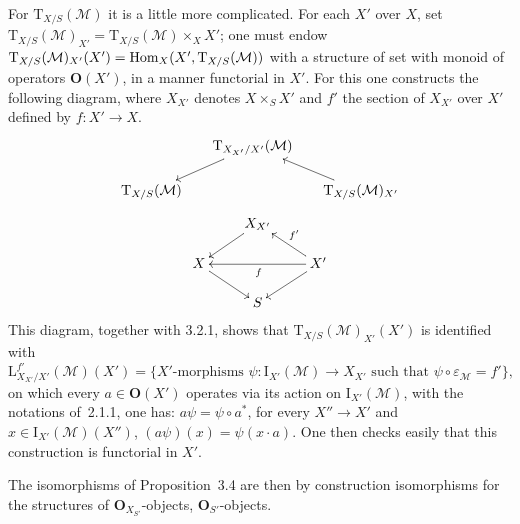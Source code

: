 For \(\mathrm{T}_{X/S}(\mathcal{M})\) it is a little more complicated. For each
\(X'\) over \(X\), set
\(\mathrm{T}_{X/S}(\mathcal{M})_{X'}
=\mathrm{T}_{X/S}(\mathcal{M})\times_X X'\);
one must endow
\(\mathrm{T}_{X/S}(\mathcal{M})_{X'}(X')
=\operatorname{Hom}_X(X',\mathrm{T}_{X/S}(\mathcal{M}))\)
with a structure of set with monoid of operators \(\mathbf{O}(X')\), in a
manner functorial in \(X'\). For this one constructs the following diagram,
where \(X_{X'}\) denotes \(X\times_S X'\) and \(f'\) the section of
\(X_{X'}\) over \(X'\) defined by \(f\colon X'\to X\).
\[
\xymatrix@C=1.6em@R=1.5em{
  & \mathrm{T}_{X_{X'}/X'}(\mathcal{M}) \ar[dl] & \\
  \mathrm{T}_{X/S}(\mathcal{M})
    & & \mathrm{T}_{X/S}(\mathcal{M})_{X'} \ar[ul]
}
\]
\[
\xymatrix@C=2.2em@R=1.5em{
  & X_{X'} \ar[dl] & \\
  X \ar[dr]
    & & X' \ar[ul]_{f'} \ar[ll]^{f} \ar[dl] \\
  & S &
}
\]
{\renewcommand{\thefootnote}{(20)}}
This diagram, together with 3.2.1, shows that
\(\mathrm{T}_{X/S}(\mathcal{M})_{X'}(X')\) is identified with
\[
\mathrm{L}^{f'}_{X_{X'}/X'}(\mathcal{M})(X')
=\{\text{\(X'\)-morphisms }
\psi\colon\mathrm{I}_{X'}(\mathcal{M})\to X_{X'}
\text{ such that }\psi\circ\varepsilon_{\mathcal{M}}=f'\},
\]
on which every \(a\in\mathbf{O}(X')\) operates via its action on
\(\mathrm{I}_{X'}(\mathcal{M})\), \ie with the notations of~2.1.1, one has:
\(a\psi=\psi\circ a^*\), \ie for every \(X''\to X'\) and
\(x\in\mathrm{I}_{X'}(\mathcal{M})(X'')\),
\((a\psi)(x)=\psi(x\cdot a)\).
One then checks easily that this construction is functorial in \(X'\).

The isomorphisms of Proposition~3.4 are then by construction isomorphisms
for the structures of \(\mathbf{O}_{X_{S'}}\)-objects, \resp
\(\mathbf{O}_{S'}\)-objects.

